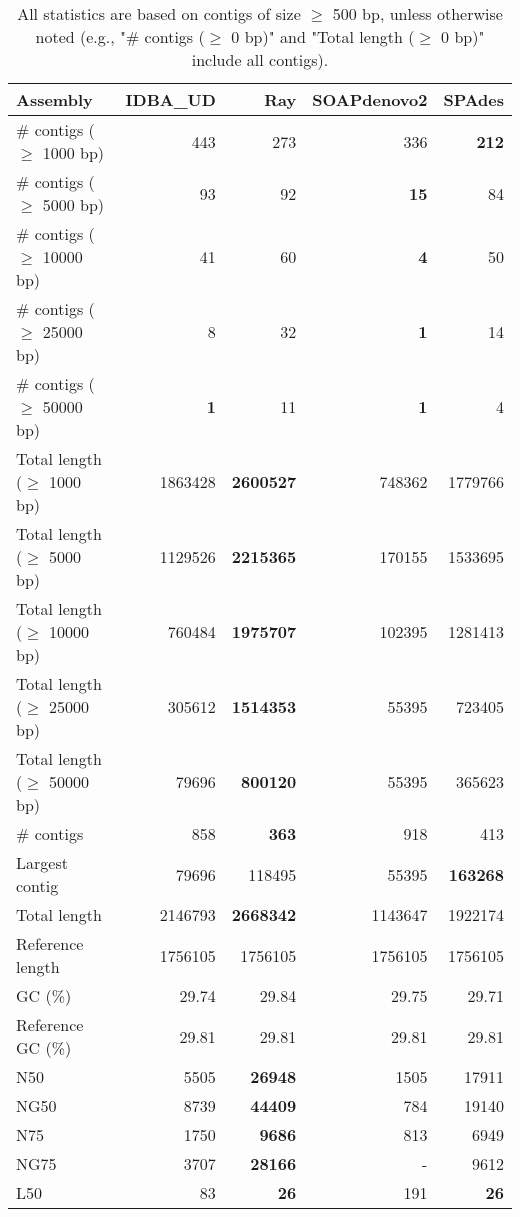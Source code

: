\documentclass[12pt,a4paper]{article}
\begin{document}
\begin{table}[ht]
\begin{center}
\caption{All statistics are based on contigs of size $\geq$ 500 bp, unless otherwise noted (e.g., "\# contigs ($\geq$ 0 bp)" and "Total length ($\geq$ 0 bp)" include all contigs).}
\begin{tabular}{|l*{4}{|r}|}
\hline
Assembly & IDBA\_UD & Ray & SOAPdenovo2 & SPAdes \\ \hline
\# contigs ($\geq$ 1000 bp) & 443 & 273 & 336 & {\bf 212} \\ \hline
\# contigs ($\geq$ 5000 bp) & 93 & 92 & {\bf 15} & 84 \\ \hline
\# contigs ($\geq$ 10000 bp) & 41 & 60 & {\bf 4} & 50 \\ \hline
\# contigs ($\geq$ 25000 bp) & 8 & 32 & {\bf 1} & 14 \\ \hline
\# contigs ($\geq$ 50000 bp) & {\bf 1} & 11 & {\bf 1} & 4 \\ \hline
Total length ($\geq$ 1000 bp) & 1863428 & {\bf 2600527} & 748362 & 1779766 \\ \hline
Total length ($\geq$ 5000 bp) & 1129526 & {\bf 2215365} & 170155 & 1533695 \\ \hline
Total length ($\geq$ 10000 bp) & 760484 & {\bf 1975707} & 102395 & 1281413 \\ \hline
Total length ($\geq$ 25000 bp) & 305612 & {\bf 1514353} & 55395 & 723405 \\ \hline
Total length ($\geq$ 50000 bp) & 79696 & {\bf 800120} & 55395 & 365623 \\ \hline
\# contigs & 858 & {\bf 363} & 918 & 413 \\ \hline
Largest contig & 79696 & 118495 & 55395 & {\bf 163268} \\ \hline
Total length & 2146793 & {\bf 2668342} & 1143647 & 1922174 \\ \hline
Reference length & 1756105 & 1756105 & 1756105 & 1756105 \\ \hline
GC (\%) & 29.74 & 29.84 & 29.75 & 29.71 \\ \hline
Reference GC (\%) & 29.81 & 29.81 & 29.81 & 29.81 \\ \hline
N50 & 5505 & {\bf 26948} & 1505 & 17911 \\ \hline
NG50 & 8739 & {\bf 44409} & 784 & 19140 \\ \hline
N75 & 1750 & {\bf 9686} & 813 & 6949 \\ \hline
NG75 & 3707 & {\bf 28166} & - & 9612 \\ \hline
L50 & 83 & {\bf 26} & 191 & {\bf 26} \\ \hline

\end{tabular}
\end{center}
\end{table}
\end{document}
